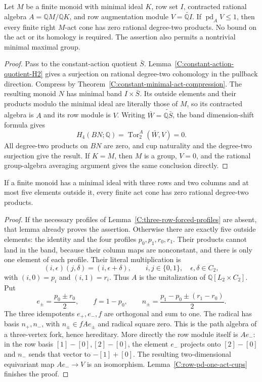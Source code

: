 \begin{lemma}
\label{C:row-pd-one-act-cups}
Let $M$ be a finite monoid with minimal ideal $K$, row set $I$,
contracted rational algebra $A=\mathbb QM/\mathbb QK$, and row
augmentation module $V=\widetilde{\mathbb QI}$.
If $\operatorname{pd}_A V\leq1$, then every finite right
$M$-act cone has zero rational degree-two products.
No bound on the act or its homology is required.
The assertion also permits a nontrivial minimal maximal group.
\end{lemma}
\begin{proof}
Pass to the constant-action quotient $\bar S$.
Lemma~\ref{C:constant-action-quotient-H2} gives a surjection on
rational degree-two cohomology in the pullback direction.
Compress by Theorem~\ref{C:constant-minimal-act-compression}.
The resulting monoid $N$ has minimal band $I\times\bar S$.
Its outside elements and their products modulo the minimal
ideal are literally those of $M$, so its contracted algebra
is $A$ and its row module is $V$.
Writing $\bar W=\widetilde{\mathbb Q\bar S}$, the band
dimension-shift formula gives
\[
 H_4(BN;\mathbb Q)
   =\operatorname{Tor}^{A}_2(\bar W,V)=0.
\]
All degree-two products on $BN$ are zero, and cup naturality
and the degree-two surjection give the result.  If $K=M$,
then $M$ is a group, $V=0$, and the rational group-algebra
averaging argument gives the same conclusion directly.
\end{proof}

\begin{proposition}
\label{C:three-row-five-outside-all-acts}
If a finite monoid has a minimal ideal with three rows and two
columns and at most five elements outside it, every finite act cone has zero
rational degree-two products.
\end{proposition}
\begin{proof}
If the necessary profiles of
Lemma~\ref{C:three-row-forced-profiles} are absent, that lemma
already proves the assertion.  Otherwise there are exactly
five outside elements: the identity and the four profiles
$p_0,p_1,r_0,r_1$.  Their products cannot land in the band,
because their column maps are nonconstant, and there is only
one element of each profile.  Their literal multiplication is
\[
 (i,\epsilon)(j,\delta)=(i,\epsilon+\delta),
 \qquad i,j\in\{0,1\},\quad\epsilon,\delta\in C_2,
\]
with $(i,0)=p_i$ and $(i,1)=r_i$.
Thus $A$ is the unitalization of $\mathbb Q[L_2\times C_2]$.
Put
\[
 e_\pm=\frac{p_0\pm r_0}{2},\qquad f=1-p_0,\qquad
 n_\pm=\frac{p_1-p_0\pm(r_1-r_0)}2.
\]
The three idempotents $e_+,e_-,f$ are orthogonal and sum to
one.  The radical has basis $n_+,n_-$, with
$n_\pm\in fAe_\pm$ and radical square zero.  This is the
path algebra of a three-vertex fork, hence hereditary.
More directly the row module itself is $Ae_-$: in the row
basis $[1]-[0],[2]-[0]$, the element $e_-$ projects onto
$[2]-[0]$ and $n_-$ sends that vector to $-[1]+[0]$.
The resulting two-dimensional equivariant map $Ae_-\to V$
is an isomorphism.  Lemma~\ref{C:row-pd-one-act-cups}
finishes the proof.
\end{proof}

